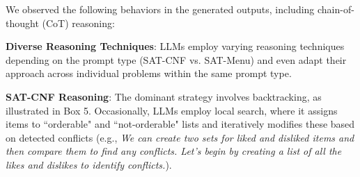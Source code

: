 \documentclass{article} %
\begin{document}


We observed the following behaviors in the generated outputs, including chain-of-thought (CoT) reasoning:



\textbf{Diverse Reasoning Techniques}: LLMs employ varying reasoning techniques depending on the prompt type (SAT-CNF vs. SAT-Menu) and even adapt their approach across individual problems within the same prompt type.

\textbf{SAT-CNF Reasoning}: The dominant strategy involves backtracking, as illustrated in Box 5. Occasionally, LLMs employ local search, where it assigns items to ``orderable" and ``not-orderable" lists and iteratively modifies these based on detected conflicts (e.g., \emph{We can create two sets for liked and disliked items and then compare them to find any conflicts. Let's begin by creating a list of all the likes and dislikes to identify conflicts.}).
\end{document}
